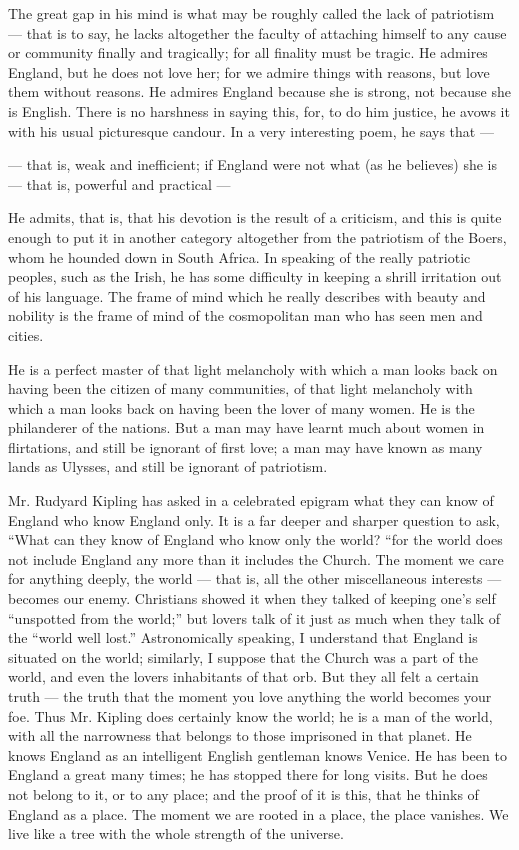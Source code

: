 The great gap in his mind is what may be roughly called the lack of patriotism — that is to say, he lacks altogether the faculty of attaching himself to any cause or community finally and tragically; for all finality must be tragic. He admires England, but he does not love her; for we admire things with reasons, but love them without reasons. He admires England because she is strong, not because she is English. There is no harshness in saying this, for, to do him justice, he avows it with his usual picturesque candour. In a very interesting poem, he says that —

— that is, weak and inefficient; if England were not what (as he believes) she is — that is, powerful and practical —

He admits, that is, that his devotion is the result of a criticism, and this is quite enough to put it in another category altogether from the patriotism of the Boers, whom he hounded down in South Africa. In speaking of the really patriotic peoples, such as the Irish, he has some difficulty in keeping a shrill irritation out of his language. The frame of mind which he really describes with beauty and nobility is the frame of mind of the cosmopolitan man who has seen men and cities.

He is a perfect master of that light melancholy with which a man looks back on having been the citizen of many communities, of that light melancholy with which a man looks back on having been the lover of many women. He is the philanderer of the nations. But a man may have learnt much about women in flirtations, and still be ignorant of first love; a man may have known as many lands as Ulysses, and still be ignorant of patriotism.

Mr. Rudyard Kipling has asked in a celebrated epigram what they can know of England who know England only. It is a far deeper and sharper question to ask, “What can they know of England who know only the world? “for the world does not include England any more than it includes the Church. The moment we care for anything deeply, the world — that is, all the other miscellaneous interests — becomes our enemy. Christians showed it when they talked of keeping one’s self “unspotted from the world;” but lovers talk of it just as much when they talk of the “world well lost.” Astronomically speaking, I understand that England is situated on the world; similarly, I suppose that the Church was a part of the world, and even the lovers inhabitants of that orb. But they all felt a certain truth — the truth that the moment you love anything the world becomes your foe. Thus Mr. Kipling does certainly know the world; he is a man of the world, with all the narrowness that belongs to those imprisoned in that planet. He knows England as an intelligent English gentleman knows Venice. He has been to England a great many times; he has stopped there for long visits. But he does not belong to it, or to any place; and the proof of it is this, that he thinks of England as a place. The moment we are rooted in a place, the place vanishes. We live like a tree with the whole strength of the universe.

